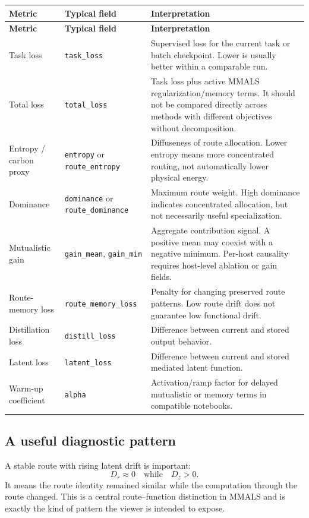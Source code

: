 \documentclass[11pt,a4paper]{article}
\newcommand{\code}[1]{\texttt{#1}}
\begin{document}
\begin{longtable}{@{}P{38mm}P{42mm}P{77mm}@{}}
\toprule
\textbf{Metric} & \textbf{Typical field} & \textbf{Interpretation}\\
\midrule
\endfirsthead
\toprule
\textbf{Metric} & \textbf{Typical field} & \textbf{Interpretation}\\
\midrule
\endhead
Task loss & \code{task\_loss} & Supervised loss for the current task or batch checkpoint. Lower is usually better within a comparable run.\\
Total loss & \code{total\_loss} & Task loss plus active MMALS regularization/memory terms. It should not be compared directly across methods with different objectives without decomposition.\\
Entropy / carbon proxy & \code{entropy} or \code{route\_entropy} & Diffuseness of route allocation. Lower entropy means more concentrated routing, not automatically lower physical energy.\\
Dominance & \code{dominance} or \code{route\_dominance} & Maximum route weight. High dominance indicates concentrated allocation, but not necessarily useful specialization.\\
Mutualistic gain & \code{gain\_mean}, \code{gain\_min} & Aggregate contribution signal. A positive mean may coexist with a negative minimum. Per-host causality requires host-level ablation or gain fields.\\
Route-memory loss & \code{route\_memory\_loss} & Penalty for changing preserved route patterns. Low route drift does not guarantee low functional drift.\\
Distillation loss & \code{distill\_loss} & Difference between current and stored output behavior.\\
Latent loss & \code{latent\_loss} & Difference between current and stored mediated latent function.\\
Warm-up coefficient & \code{alpha} & Activation/ramp factor for delayed mutualistic or memory terms in compatible notebooks.\\
\bottomrule
\end{longtable}

\subsection{A useful diagnostic pattern}

A stable route with rising latent drift is important:
\[
  D_r \approx 0 \quad \text{while} \quad D_z > 0.
\]
It means the route identity remained similar while the computation through the route changed. This is a central route--function distinction in MMALS and is exactly the kind of pattern the viewer is intended to expose.
\end{document}
